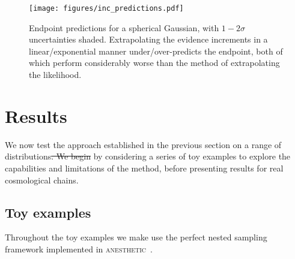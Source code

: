 \documentclass[usenatbib]{mnras}
\providecommand{\DIFaddtex}[1]{{\protect\color{blue}\uwave{#1}}} %
\providecommand{\DIFdeltex}[1]{{\protect\color{red}\sout{#1}}}                      %
\providecommand{\DIFaddbegin}{} %
\providecommand{\DIFaddend}{} %
\providecommand{\DIFdelbegin}{} %
\providecommand{\DIFdelend}{} %
\providecommand{\DIFadd}[1]{\texorpdfstring{\DIFaddtex{#1}}{#1}} %
\providecommand{\DIFdel}[1]{\texorpdfstring{\DIFdeltex{#1}}{}} %
\newcommand{\DIFscaledelfig}{0.5}
\newlength{\DIFdelgraphicswidth} %
\newlength{\DIFdelgraphicsheight} %
\newcommand{\DIFaddincludegraphics}[2][]{{\color{blue}\fbox{\DIFOincludegraphics[#1]{#2}}}} %
\newcommand{\DIFdelincludegraphics}[2][]{%
\sbox{\DIFdelgraphicsbox}{\DIFOincludegraphics[#1]{#2}}%
\settoboxwidth{\DIFdelgraphicswidth}{\DIFdelgraphicsbox} %
\settoboxtotalheight{\DIFdelgraphicsheight}{\DIFdelgraphicsbox} %
\scalebox{\DIFscaledelfig}{%
\parbox[b]{\DIFdelgraphicswidth}{\usebox{\DIFdelgraphicsbox}\\[-\baselineskip] \rule{\DIFdelgraphicswidth}{0em}}\llap{\resizebox{\DIFdelgraphicswidth}{\DIFdelgraphicsheight}{%
\setlength{\unitlength}{\DIFdelgraphicswidth}%
\begin{picture}(1,1)%
\thicklines\linethickness{2pt} %
{\color[rgb]{1,0,0}\put(0,0){\framebox(1,1){}}}%
{\color[rgb]{1,0,0}\put(0,0){\line( 1,1){1}}}%
{\color[rgb]{1,0,0}\put(0,1){\line(1,-1){1}}}%
\end{picture}%
}\hspace*{3pt}}} %
} %
\DeclareRobustCommand{\DIFaddbegin}{\DIFOaddbegin \let\includegraphics\DIFaddincludegraphics} %
\DeclareRobustCommand{\DIFaddend}{\DIFOaddend \let\includegraphics\DIFOincludegraphics} %
\DeclareRobustCommand{\DIFdelbegin}{\DIFOdelbegin \let\includegraphics\DIFdelincludegraphics} %
\DeclareRobustCommand{\DIFdelend}{\DIFOaddend \let\includegraphics\DIFOincludegraphics} %
\begin{document}
\begin{figure}
\texttt{[image: figures/inc\_predictions.pdf]}
\caption{Endpoint predictions for a spherical Gaussian, with $1-2\sigma$ uncertainties shaded. Extrapolating the evidence increments in a linear/exponential manner under/over-predicts the endpoint, both of which perform considerably worse than the method of extrapolating the likelihood.}
\label{fig:inc_predictions}
\end{figure}

\section{Results}\label{sec:results}
We now test the approach established in the previous section on a range of distributions\DIFdelbegin \DIFdel{. We begin }\DIFdelend \DIFaddbegin \DIFadd{, beginning }\DIFaddend by considering a series of toy examples to explore the capabilities and limitations of the method, before presenting results for real cosmological chains.
\subsection{Toy examples}\DIFaddbegin \label{sec:logXfs_toy}
\DIFaddend Throughout the toy examples we make use the perfect nested sampling~\citep{Keeton_2011,2018BayAn..13..873H} framework implemented in \textsc{anesthetic}~\citep{anesthetic}.
\end{document}
